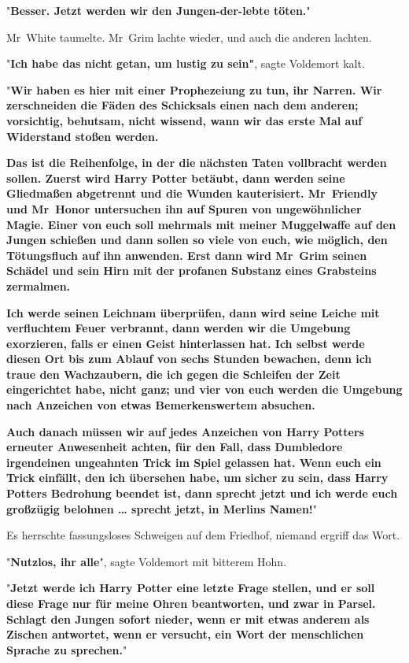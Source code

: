 {"\textbf{Besser. Jetzt werden wir den Jungen-der-lebte töten.}"

Mr~White taumelte. Mr~Grim lachte wieder, und auch die anderen lachten.

"\textbf{Ich habe das nicht getan, um lustig zu sein"}, sagte Voldemort kalt.

"\textbf{Wir haben es hier mit einer Prophezeiung zu tun, ihr Narren. Wir zerschneiden die Fäden des Schicksals einen nach dem anderen; vorsichtig, behutsam, nicht wissend, wann wir das erste Mal auf Widerstand stoßen werden.}

\textbf{\hfill\break Das ist die Reihenfolge, in der die nächsten Taten vollbracht werden sollen. Zuerst wird Harry Potter betäubt, dann werden seine Gliedmaßen abgetrennt und die Wunden kauterisiert. Mr~Friendly und Mr~Honor untersuchen ihn auf Spuren von ungewöhnlicher Magie. Einer von euch soll mehrmals mit meiner Muggelwaffe auf den Jungen schießen und dann sollen so viele von euch, wie möglich, den Tötungsfluch auf ihn anwenden. Erst dann wird Mr~Grim seinen Schädel und sein Hirn mit der profanen Substanz eines Grabsteins zermalmen.}

\textbf{\hfill\break Ich werde seinen Leichnam überprüfen, dann wird seine Leiche mit verfluchtem Feuer verbrannt, dann werden wir die Umgebung exorzieren, falls er einen Geist hinterlassen hat. Ich selbst werde diesen Ort bis zum Ablauf von sechs Stunden bewachen, denn ich traue den Wachzaubern, die ich gegen die Schleifen der Zeit eingerichtet habe, nicht ganz; und vier von euch werden die Umgebung nach Anzeichen von etwas Bemerkenswertem absuchen.}

\textbf{\hfill\break Auch danach müssen wir auf jedes Anzeichen von Harry Potters erneuter Anwesenheit achten, für den Fall, dass Dumbledore irgendeinen ungeahnten Trick im Spiel gelassen hat. Wenn euch ein Trick einfällt, den ich übersehen habe, um sicher zu sein, dass Harry Potters Bedrohung beendet ist, dann sprecht jetzt und ich werde euch großzügig belohnen … sprecht jetzt, in Merlins Namen!}"

Es herrschte fassungsloses Schweigen auf dem Friedhof, niemand ergriff das Wort.

"\textbf{Nutzlos, ihr alle}", sagte Voldemort mit bitterem Hohn.

"\textbf{Jetzt werde ich Harry Potter eine letzte Frage stellen, und er soll diese Frage nur für meine Ohren beantworten, und zwar in Parsel. Schlagt den Jungen sofort nieder, wenn er mit etwas anderem als Zischen antwortet, wenn er versucht, ein Wort der menschlichen Sprache zu sprechen.}"

}
